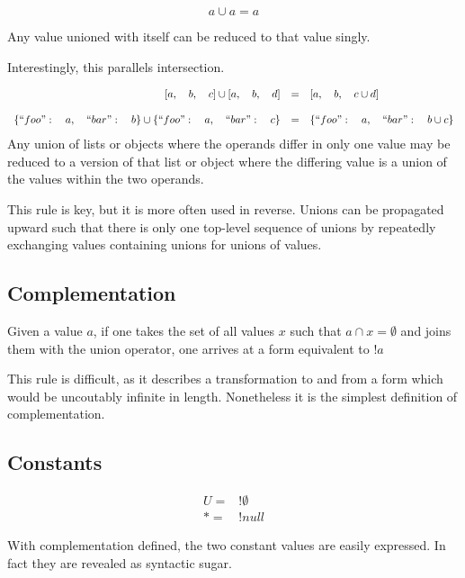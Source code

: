 \documentclass[letterpaper]{article}
\begin{document}
\begin{prule}
\begin{equation}
a\cup a = a
\end{equation}

Any value unioned with itself can be reduced to that value singly.
\end{prule}

Interestingly, this parallels intersection.

\begin{prule}
\begin{equation}
\begin{array}{rcl}

{[}a,\quad b,\quad c] \cup {[}a,\quad b,\quad d] &=& {[}a,\quad b,\quad c \cup d] \\
\\
\{``foo":\quad a,\quad``bar":\quad b\} \cup \{``foo":\quad a,\quad``bar":\quad c\}
&=& \{``foo":\quad a,\quad``bar":\quad b \cup c\}

\end{array}
\end{equation}
Any union of lists or objects where the operands  differ in only one value may
be reduced to a version of that list or object where the differing value is a
union of the values within the two operands.
\end{prule}

This rule is key, but it is more often used in reverse. Unions can be
propagated upward such that there is only one top-level sequence of unions by
repeatedly exchanging values containing unions for unions of values.

\subsection{Complementation}
\begin{prule}
Given a value \(a\), if one takes the set of all values \(x\) such that \(a
\cap x = \emptyset\) and joins them with the union operator, one arrives at a
form equivalent to \(!a\)
\end{prule}

This rule is difficult, as it describes a transformation to and from a form
which would be uncoutably infinite in length. Nonetheless it is the simplest
definition of complementation.

\subsection{Constants}
\begin{equation}
\begin{split}
U = &!\emptyset \\
* = &!null
\end{split}
\end{equation}

With complementation defined, the two constant values are easily expressed. In
fact they are revealed as syntactic sugar.
\end{document}
